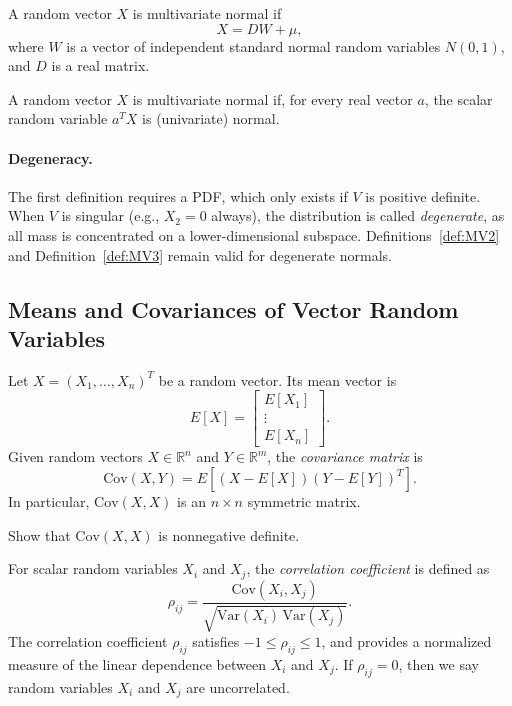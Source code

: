 \documentclass{article}
\begin{document}
\begin{definition}\label{def:MV2}
A random vector $X$ is multivariate normal if
\[
X = D W + \mu,
\]
where $W$ is a vector of independent standard normal random variables $N(0,1)$,
and $D$ is a real matrix.
\end{definition}

\begin{definition}\label{def:MV3}
A random vector $X$ is multivariate normal if, for every real vector $a$,
the scalar random variable $a^T X$ is (univariate) normal.
\end{definition}

\paragraph{Degeneracy.}
The first definition requires a PDF, which only exists if $V$ is positive definite.
When $V$ is singular (e.g., $X_2 = 0$ always), the distribution is called
\emph{degenerate}, as all mass is concentrated on a lower-dimensional subspace.
Definitions~\ref{def:MV2} and Definition~\ref{def:MV3} remain valid for degenerate normals.



\subsection{Means and Covariances of Vector Random Variables}

Let $X = (X_1, \dots, X_n)^T$ be a random vector.  
Its mean vector is
\[
E[X] = \begin{bmatrix} E[X_1] \\ \vdots \\ E[X_n] \end{bmatrix}.
\]
Given random vectors $X \in \mathbb{R}^n$ and $Y \in \mathbb{R}^m$, the
\emph{covariance matrix} is
\[
\mathrm{Cov}(X, Y) = E\left[(X - E[X])(Y - E[Y])^T\right].
\]
In particular, $\mathrm{Cov}(X, X)$ is an $n \times n$ symmetric matrix.

\begin{exercise}
Show that $\mathrm{Cov}(X, X)$ is nonnegative definite.
\end{exercise}

For scalar random variables $X_i$ and $X_j$, the \emph{correlation coefficient} is defined as
\[
\rho_{ij} = \frac{\mathrm{Cov}(X_i, X_j)}
{\sqrt{\mathrm{Var}(X_i)\,\mathrm{Var}(X_j)}}.
\]
The correlation coefficient $\rho_{ij}$ satisfies $-1 \le \rho_{ij} \le 1$,  
and provides a normalized measure of the linear dependence between $X_i$ and $X_j$.
If $\rho_{ij}=0$, then we say random variables $X_i$ and $X_j$ are uncorrelated.
\end{document}
